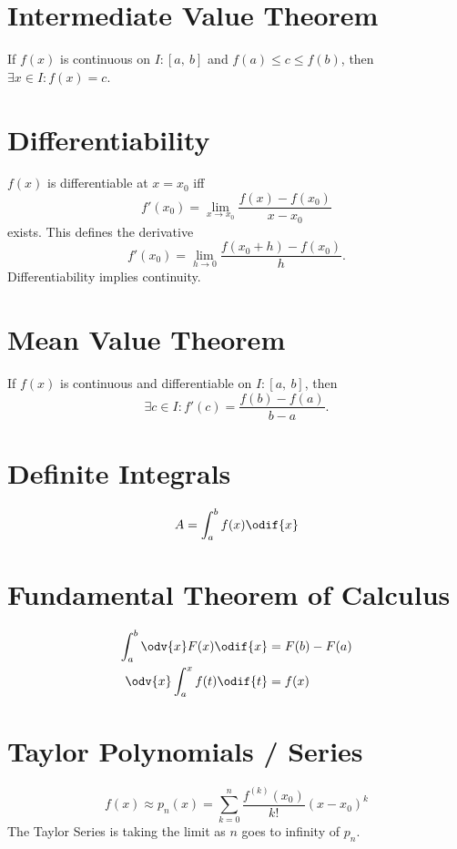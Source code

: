 \documentclass{article}
\begin{document}
\begin{multicols}{3}
    \section*{Intermediate Value Theorem}
    If \(f(x)\) is continuous on \(I:\left[ a, \: b \right]\) and \(f(a) \leq c \leq f(b)\), then \(\exists x\in I:f(x)=c\).
    \section*{Differentiability}
    \(f(x)\) is differentiable at \(x=x_0\) iff
    \begin{equation*}
        f'(x_0) = \lim_{x\to x_0} \frac{f(x)-f(x_0)}{x-x_0}
    \end{equation*}
    exists. This defines the derivative
    \begin{equation*}
        f'(x_0) = \lim_{h\to 0} \frac{f(x_0+h)-f(x_0)}{h}.
    \end{equation*}
    Differentiability implies continuity.
    \section*{Mean Value Theorem}
    If \(f(x)\) is continuous and differentiable on \(I:\left[ a,\:b \right]\), then
    \begin{equation*}
        \exists c\in I:f'(c)=\frac{f(b)-f(a)}{b-a}.
    \end{equation*}
    \section*{Definite Integrals}
    \begin{equation*}
        A = \int_a^b f(x) \odif{x}
    \end{equation*}
    \section*{Fundamental Theorem of Calculus}
    \begin{align*}
        \int_a^b \odv{x}F(x) \odif{x} & = F(b) - F(a) \\
        \odv{x}\int_a^x f(t) \odif{t} & = f(x)
    \end{align*}
    \section*{Taylor Polynomials / Series}
    \begin{equation*}
        f(x) \approx p_n(x) = \sum_{k=0}^n \frac{f^{\left( k \right)}(x_0)}{k!} \left( x-x_0 \right)^k
    \end{equation*}
    The Taylor Series is taking the limit as \(n\) goes to infinity of \(p_n\).


\end{multicols}
\end{document}
